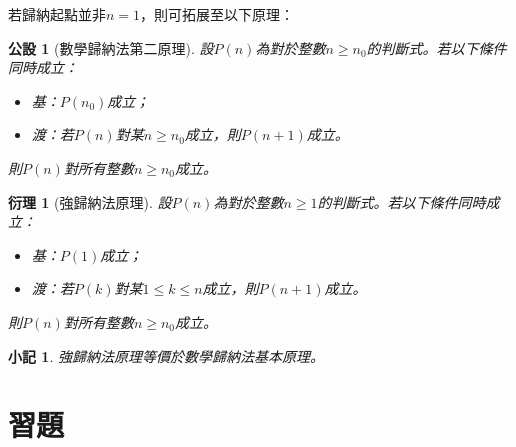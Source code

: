 \documentclass[12pt]{article}
\newtheorem*{corollary}{衍理}
\newtheorem*{remark}{小記}
\newtheorem*{axiom}{公設}
\begin{document}
    若歸納起點並非$n=1$，則可拓展至以下原理：

    \begin{axiom}[數學歸納法第二原理]
        設$P(n)$為對於整數$n\geq n_0$的判斷式。若以下條件同時成立：\begin{itemize}
            \item 基：$P(n_0)$成立；
            \item 渡：若$P(n)$對某$n\geq n_0$成立，則$P(n+1)$成立。
        \end{itemize}
        則$P(n)$對所有整數$n\geq n_0$成立。
    \end{axiom}

    \begin{corollary}[強歸納法原理]
        設$P(n)$為對於整數$n\geq 1$的判斷式。若以下條件同時成立：\begin{itemize}
            \item 基：$P(1)$成立；
            \item 渡：若$P(k)$對某$1\leq k\leq n$成立，則$P(n+1)$成立。
        \end{itemize}
        則$P(n)$對所有整數$n\geq n_0$成立。
    \end{corollary}

    \begin{remark}
        強歸納法原理等價於數學歸納法基本原理。
    \end{remark}

    \section*{習題}
\end{document}
